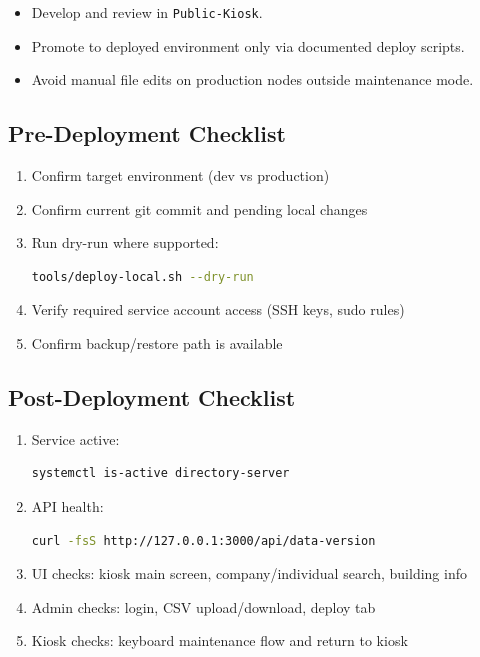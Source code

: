 \documentclass[11pt,letterpaper]{article}
\begin{document}
\begin{itemize}
\item Develop and review in \texttt{Public-Kiosk}.
\item Promote to deployed environment only via documented deploy scripts.
\item Avoid manual file edits on production nodes outside maintenance mode.
\end{itemize}

\subsection{Pre-Deployment Checklist}

\begin{enumerate}
\item Confirm target environment (dev vs production)
\item Confirm current git commit and pending local changes
\item Run dry-run where supported:
\begin{lstlisting}[language=bash]
tools/deploy-local.sh --dry-run
\end{lstlisting}
\item Verify required service account access (SSH keys, sudo rules)
\item Confirm backup/restore path is available
\end{enumerate}

\subsection{Post-Deployment Checklist}

\begin{enumerate}
\item Service active:
\begin{lstlisting}[language=bash]
systemctl is-active directory-server
\end{lstlisting}
\item API health:
\begin{lstlisting}[language=bash]
curl -fsS http://127.0.0.1:3000/api/data-version
\end{lstlisting}
\item UI checks: kiosk main screen, company/individual search, building info
\item Admin checks: login, CSV upload/download, deploy tab
\item Kiosk checks: keyboard maintenance flow and return to kiosk
\end{enumerate}
\end{document}
